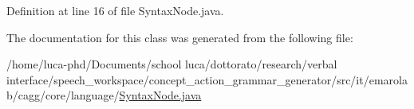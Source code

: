 Definition at line 16 of file Syntax\-Node.\-java.



The documentation for this class was generated from the following file\-:\begin{DoxyCompactItemize}
\item 
/home/luca-\/phd/\-Documents/school luca/dottorato/research/verbal interface/speech\-\_\-workspace/concept\-\_\-action\-\_\-grammar\-\_\-generator/src/it/emarolab/cagg/core/language/\hyperlink{SyntaxNode_8java}{Syntax\-Node.\-java}\end{DoxyCompactItemize}
